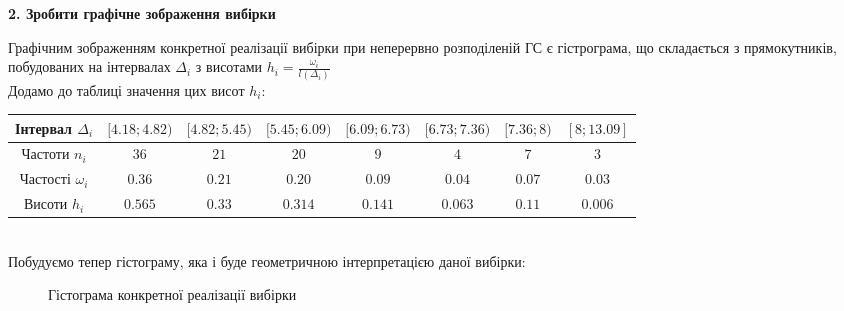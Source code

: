\documentclass[11 pt]{article}
\begin{document}
\newpage
\begin{center}
    \large
    \textbf{2. Зробити графічне зображення вибірки}
\end{center}
Графічним зображенням конкретної реалізації вибірки при неперервно розподіленій ГС є гістрограма, 
що складається з прямокутників, побудованих на інтервалах $\Delta_i$ з висотами 
$h_i = \frac{\omega_i}{l(\Delta_i)}$\\ 
Додамо до таблиці значення цих висот $h_i$:
\begin{table}[h!]
	\begin{center}
		\begin{tabular}{|c|c|c|c|c|c|c|c|}\hline 
            Інтервал $\Delta_i$ & 
            $[4.18; 4.82)$ & $[4.82; 5.45)$ & $[5.45; 6.09)$ & $[6.09; 6.73)$ & $[6.73; 7.36)$
            & $[7.36;8)$ & $[8; 13.09]$   
            \\ \hline
			Частоти $n_i$ &$36$&$21$&$20$&$9$&$4$&$7$&$3$ \\ \hline
			Частості $\omega_i$&$0.36$&$0.21$&$0.20$&$0.09$&$0.04$&$0.07$&$0.03$ \\ \hline
            Висоти $h_i$&$0.565$&$0.33$&$0.314$&$0.141$&$0.063$&$0.11$&$0.006$ \\ \hline
		\end{tabular}
	\end{center}
\end{table}\\
Побудуємо тепер гістограму, яка і буде геометричною інтерпретацією даної вибірки:
\\
\begin{figure}[H]
	\centering
    \caption{Гістограма конкретної реалізації вибірки}

\end{figure}
\end{document}
